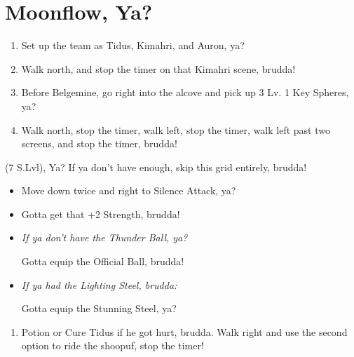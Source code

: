 \chapter{Moonflow, Ya?}

\begin{enumerate}
\item Set up the team as Tidus, Kimahri, and Auron, ya?
\item Walk north, and stop the timer on that Kimahri scene, brudda!
\item Before Belgemine, go right into the alcove and pick up 3 Lv. 1 Key Spheres, ya?
\item Walk north, stop the timer, walk left, stop the timer, walk left past two screens, and stop the timer, brudda!
\end{enumerate}
\begin{spheregrid}
\begin{itemize}
\wakkaf (7 S.Lvl), Ya? If ya don't have enough, skip this grid entirely, brudda!
\begin{itemize}
\item Move down twice and right to Silence Attack, ya?
\item Gotta get that +2 Strength, brudda!
\end{itemize}
\end{itemize}
\end{spheregrid}
\begin{equip}
\begin{itemize}
\item \textit{If ya don't have the Thunder Ball, ya?}
\begin{itemize}
\wakkaf Gotta equip the Official Ball, brudda!
\end{itemize}
\item \textit{If ya had the Lighting Steel, brudda:}
\begin{itemize}
\tidusf Gotta equip the Stunning Steel, ya?
\end{itemize}
\end{itemize}
\end{equip}
\begin{enumerate}[resume]
\item Potion or Cure Tidus if he got hurt, brudda. Walk right and use the second option to ride the shoopuf, stop the timer!
\end{enumerate}
